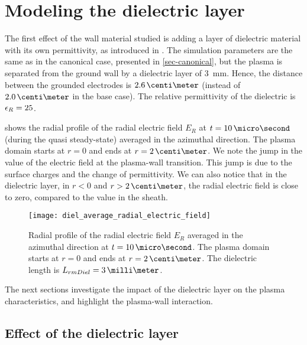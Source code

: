 
\section{Modeling the dielectric layer }
  \label{sec-diel_layer}
  
  The first effect of the wall material studied is adding a layer of dielectric material with its own permittivity, as introduced in .
  The simulation parameters are the same as in the canonical case, presented in \cref{sec-canonical}, but the plasma is separated from the ground wall by a dielectric layer of 3~mm.
  Hence, the distance between the grounded electrodes is $2.6\,\centi\meter$ (instead of  $2.0\,\centi\meter$ in the base case).
  The relative permittivity of the dielectric is $\epsilon_{R}=25$.
  
   shows the radial profile of the radial electric field $E_R$ at $t=10\,\micro\second$ (during the quasi steady-state) averaged in the azimuthal direction.
  The plasma domain starts at $r=0$ and ends at $r=2\,\centi\meter$.
  We note the jump in the value of the electric field at the plasma-wall transition.
  This jump is due to the surface charges and the change of permittivity.
  We can also notice that in the dielectric layer, in $r < 0$ and $r > 2\,\centi\meter$, the radial electric field is close to zero, compared to the value in the sheath.
  
  \begin{figure}[hbt]
    \centering
    \texttt{[image: diel\_average\_radial\_electric\_field]}
    \caption{Radial profile of the radial electric field $E_R$ averaged in the azimuthal direction at $t=10\,\micro\second$. The plasma domain starts at $r=0$ and ends at $r=2\,\centi\meter$. The dielectric length is $L_{\\rm Diel} = 3\,\milli\meter$.  }
    \label{fig-diel_radial_Er}
  \end{figure}
  
  The next sections investigate the impact of the dielectric layer on the plasma characteristics, and highlight the plasma-wall interaction.
  
  \subsection{Effect of the dielectric layer} \label{subsec-effect_mob}
    
